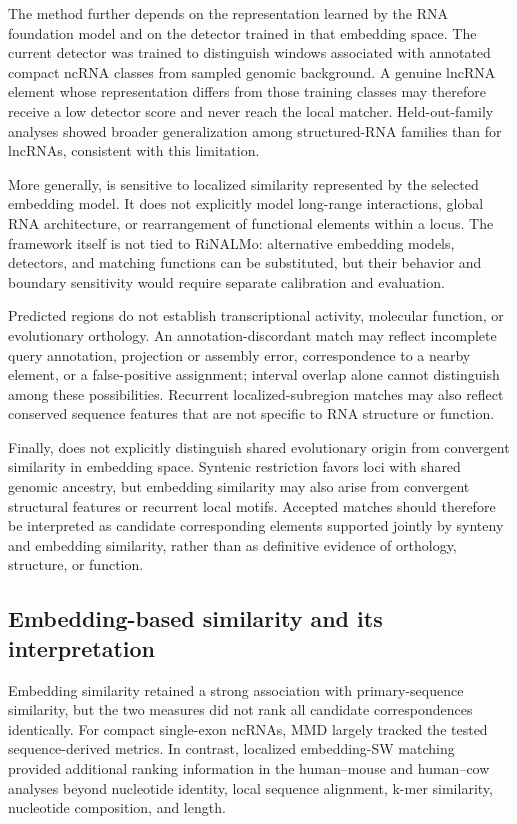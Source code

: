 The method further depends on the representation learned by the RNA foundation
model and on the detector trained in that embedding space. The current detector
was trained to distinguish windows associated with annotated compact ncRNA
classes from sampled genomic background. A genuine lncRNA element whose
representation differs from those training classes may therefore receive a low
detector score and never reach the local matcher. Held-out-family analyses showed
broader generalization among structured-RNA families than for lncRNAs, consistent
with this limitation.

More generally, \curia{} is sensitive to localized similarity represented by the
selected embedding model. It does not explicitly model long-range interactions,
global RNA architecture, or rearrangement of functional elements within a locus.
The framework itself is not tied to RiNALMo: alternative embedding models,
detectors, and matching functions can be substituted, but their behavior and
boundary sensitivity would require separate calibration and evaluation.

Predicted regions do not establish transcriptional activity, molecular function,
or evolutionary orthology. An annotation-discordant match may reflect incomplete
query annotation, projection or assembly error, correspondence to a nearby
element, or a false-positive assignment; interval overlap alone cannot distinguish
among these possibilities. Recurrent localized-subregion matches may also reflect
conserved sequence features that are not specific to RNA structure or function.

Finally, \curia{} does not explicitly distinguish shared evolutionary origin from
convergent similarity in embedding space. Syntenic restriction favors loci with
shared genomic ancestry, but embedding similarity may also arise from convergent
structural features or recurrent local motifs. Accepted matches should therefore
be interpreted as candidate corresponding elements supported jointly by synteny
and embedding similarity, rather than as definitive evidence of orthology,
structure, or function.

\subsection{Embedding-based similarity and its interpretation}

Embedding similarity retained a strong association with primary-sequence
similarity, but the two measures did not rank all candidate correspondences
identically. For compact single-exon ncRNAs, MMD largely tracked the tested
sequence-derived metrics. In contrast, localized embedding-SW matching provided
additional ranking information in the human--mouse and human--cow analyses beyond
nucleotide identity, local sequence alignment, k-mer similarity, nucleotide
composition, and length.

